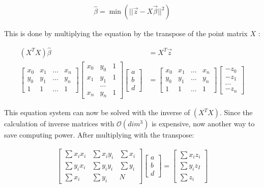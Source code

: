 \documentclass[11pt,oneside,openright]{mpreport}
\begin{document}
\begin{align*}
\hat{\beta} = \min{(|| \vec{z} - X\vec{\beta} ||^2)}
\end{align*}

This is done by multiplying the equation by the transpose of the point matrix $X$ \cite{Goldberger1964}:

\begin{align*}
(X^TX) \hat{\beta} &= X^T \vec{z}\\
\begin{bmatrix}
x_0 & x_1 & \dots & x_n \\
y_0 & y_1 & \dots & y_n \\
1 & 1 & \dots & 1  
\end{bmatrix} 
\begin{bmatrix}
x_0 & y_0 & 1 \\
x_1 & y_1 & 1 \\
 & \dots & \\
x_n & y_n & 1 
\end{bmatrix} 
\begin{bmatrix}
a \\
b \\
d 
\end{bmatrix} 
 &= 
\begin{bmatrix}
x_0 & x_1 & \dots & x_n \\
y_0 & y_1 & \dots & y_n \\
1 & 1 & \dots & 1  
\end{bmatrix} 
\begin{bmatrix}
-z_0 \\
-z_1 \\
\dots \\
-z_n 
\end{bmatrix} 
\end{align*}
% 

This equation system can now be solved with the inverse of $(X^TX)$. Since the calculation of inverse matrices with $\mathcal{O}(dim^3)$ is expensive, now another way to save computing power.
After multiplying with the transpose:

\begin{align*}
\begin{bmatrix}
\sum x_i x_i & \sum x_i y_i & \sum x_i \\
\sum y_i x_i & \sum y_i y_i & \sum y_i \\
\sum x_i & \sum y_i & N
\end{bmatrix} 
\begin{bmatrix}
a \\
b \\
d 
\end{bmatrix} 
 = 
\begin{bmatrix}
\sum x_i z_i \\
\sum y_i z_I \\
\sum z_i 
\end{bmatrix} 
\end{align*}
\end{document}
